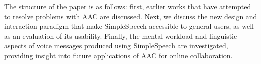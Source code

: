 The structure of the paper is as follows: first, earlier works that have attempted to resolve problems with AAC are discussed. 
Next, we discuss the new design and interaction paradigm that make SimpleSpeech accessible to general users, as well as an evaluation of its usability. 
Finally, the mental workload and linguistic aspects of voice messages produced using SimpleSpeech are investigated, providing insight into future applications of AAC for online collaboration.
